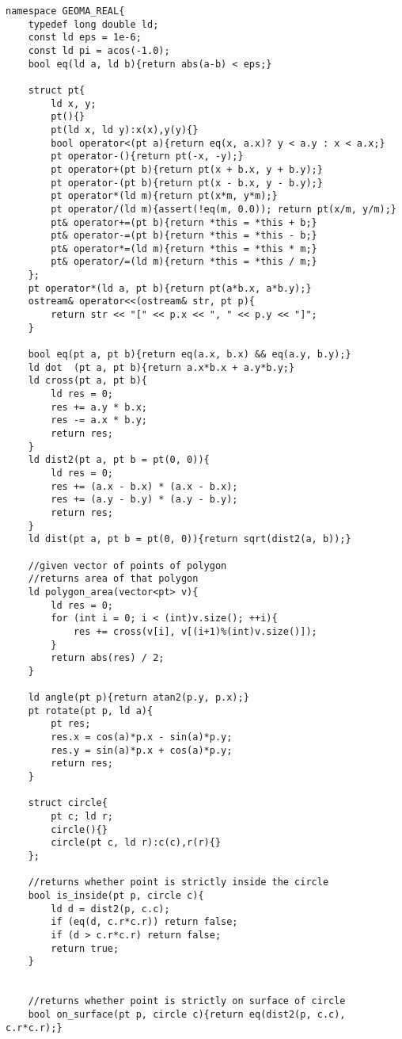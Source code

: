 \documentclass[a4paper,12pt]{report}
\begin{document}
\begin{lstlisting}
namespace GEOMA_REAL{
    typedef long double ld;
    const ld eps = 1e-6;
    const ld pi = acos(-1.0);
    bool eq(ld a, ld b){return abs(a-b) < eps;}
    
    struct pt{
        ld x, y;
        pt(){}
        pt(ld x, ld y):x(x),y(y){}
        bool operator<(pt a){return eq(x, a.x)? y < a.y : x < a.x;}
        pt operator-(){return pt(-x, -y);}
        pt operator+(pt b){return pt(x + b.x, y + b.y);}
        pt operator-(pt b){return pt(x - b.x, y - b.y);}
        pt operator*(ld m){return pt(x*m, y*m);}
        pt operator/(ld m){assert(!eq(m, 0.0)); return pt(x/m, y/m);}
        pt& operator+=(pt b){return *this = *this + b;}
        pt& operator-=(pt b){return *this = *this - b;}
        pt& operator*=(ld m){return *this = *this * m;}
        pt& operator/=(ld m){return *this = *this / m;}
    };
    pt operator*(ld a, pt b){return pt(a*b.x, a*b.y);}
    ostream& operator<<(ostream& str, pt p){ 
        return str << "[" << p.x << ", " << p.y << "]";
    }

    bool eq(pt a, pt b){return eq(a.x, b.x) && eq(a.y, b.y);}
    ld dot  (pt a, pt b){return a.x*b.x + a.y*b.y;}
    ld cross(pt a, pt b){
        ld res = 0;
        res += a.y * b.x;
        res -= a.x * b.y;
        return res;
    }
    ld dist2(pt a, pt b = pt(0, 0)){
        ld res = 0;
        res += (a.x - b.x) * (a.x - b.x);
        res += (a.y - b.y) * (a.y - b.y);
        return res;
    }
    ld dist(pt a, pt b = pt(0, 0)){return sqrt(dist2(a, b));}
    
    //given vector of points of polygon
    //returns area of that polygon
    ld polygon_area(vector<pt> v){
        ld res = 0;
        for (int i = 0; i < (int)v.size(); ++i){
            res += cross(v[i], v[(i+1)%(int)v.size()]);
        }
        return abs(res) / 2;
    }

    ld angle(pt p){return atan2(p.y, p.x);}
    pt rotate(pt p, ld a){
        pt res;
        res.x = cos(a)*p.x - sin(a)*p.y;
        res.y = sin(a)*p.x + cos(a)*p.y;
        return res;
    }

    struct circle{
        pt c; ld r;
        circle(){}
        circle(pt c, ld r):c(c),r(r){}
    };
    
    //returns whether point is strictly inside the circle
    bool is_inside(pt p, circle c){
        ld d = dist2(p, c.c);
        if (eq(d, c.r*c.r)) return false;
        if (d > c.r*c.r) return false;
        return true;
    }


    //returns whether point is strictly on surface of circle
    bool on_surface(pt p, circle c){return eq(dist2(p, c.c), c.r*c.r);}



\end{lstlisting}
\end{document}
